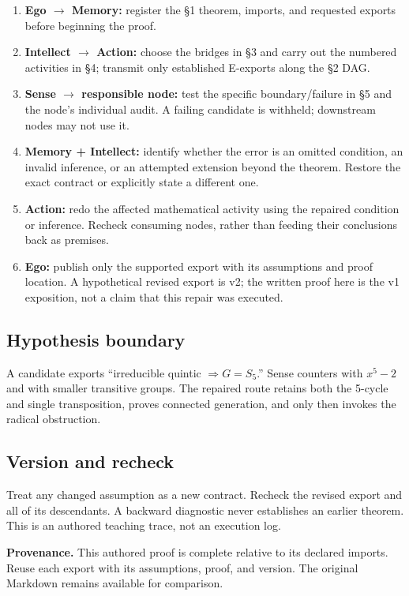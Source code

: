 \documentclass[preprint,12pt,aps,pra,showkeys,amsmath,amssymb,superscriptaddress,floatfix]{revtex4-2}
\theoremstyle{definition}
\theoremstyle{remark}
\providecommand{\tightlist}{\setlength{\itemsep}{2pt}\setlength{\parskip}{0pt}}
\begin{document}
\begin{enumerate}
\def\labelenumi{\arabic{enumi}.}
\tightlist
\item
  \textbf{Ego \(\to\) Memory:} register the §1 theorem, imports, and
  requested exports before beginning the proof.
\item
  \textbf{Intellect \(\to\) Action:} choose the bridges in §3 and carry
  out the numbered activities in §4; transmit only established E-exports
  along the §2 DAG.
\item
  \textbf{Sense \(\to\) responsible node:} test the specific
  boundary/failure in §5 and the node's individual audit. A failing
  candidate is withheld; downstream nodes may not use it.
\item
  \textbf{Memory + Intellect:} identify whether the error is an omitted
  condition, an invalid inference, or an attempted extension beyond the
  theorem. Restore the exact contract or explicitly state a different
  one.
\item
  \textbf{Action:} redo the affected mathematical activity using the
  repaired condition or inference. Recheck consuming nodes, rather than
  feeding their conclusions back as premises.
\item
  \textbf{Ego:} publish only the supported export with its assumptions
  and proof location. A hypothetical revised export is v2; the written
  proof here is the v1 exposition, not a claim that this repair was
  executed.
\end{enumerate}

\subsection{Hypothesis boundary}
A candidate exports ``irreducible quintic \(\Longrightarrow G=S_{5}\).''
Sense counters with \(x^{5}-2\) and with smaller transitive groups. The
repaired route retains both the 5-cycle and single transposition, proves
connected generation, and only then invokes the radical obstruction.

\subsection{Version and recheck}
Treat any changed assumption as a new contract. Recheck the revised
export and all of its descendants. A backward diagnostic never
establishes an earlier theorem. This is an authored teaching trace, not
an execution log.

\par\medskip\begingroup\small\linespread{1.0}\selectfont\noindent\textbf{Provenance.} This authored proof is complete relative to its declared imports. Reuse
each export with its assumptions, proof, and version. The original
Markdown remains available for comparison.
\par\endgroup
\end{document}

